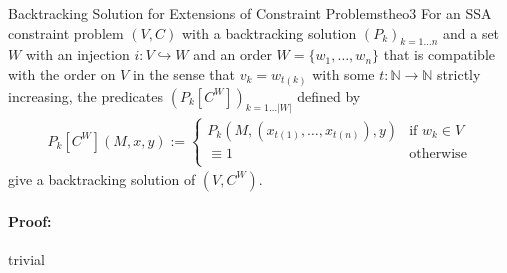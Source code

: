 \begin{theorem}{Backtracking Solution for Extensions of Constraint Problems}{theo3}
    For an SSA constraint problem $(V,C)$ with a backtracking
    solution $(P_k)_{k=1\dots n}$ and a set $W$ with an injection
    $i:V\hookrightarrow W$ and an order $W=\{w_1,\dots,w_n\}$ that is
    compatible with the order on $V$ in the sense that $v_k=w_{t(k)}$ with
    some $t:\mathbb N\rightarrow\mathbb N$ strictly increasing, the
    predicates $(P_k[C^W])_{k=1\dots |W|}$ defined by
    \begin{align*}
        P_k[C^W](M,x,y):=\left\{
            \begin{array}{ll}
                P_k\left(M,\left(x_{t(1)},\dots,x_{t(n)}\right),y\right)&\text{if }w_k\in V\\
                \equiv 1&\text{otherwise}\\
            \end{array}\right.
    \end{align*}
    give a backtracking solution of $(V,C^W)$.
    \tcblower
    \paragraph*{Proof:} trivial
\end{theorem}
